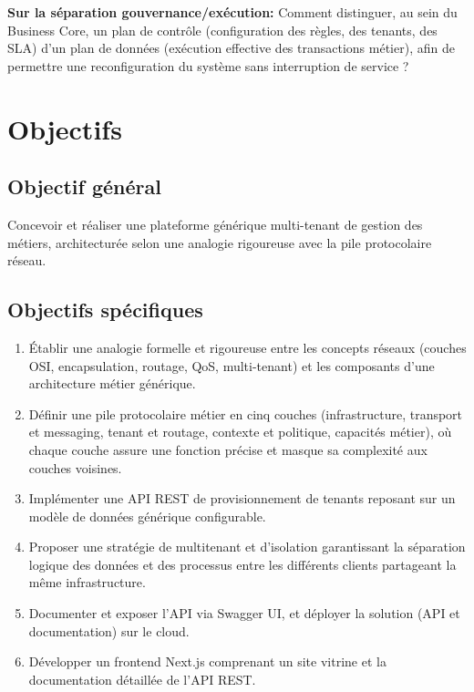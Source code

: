     \textbf{Sur la séparation gouvernance/exécution:} Comment distinguer, au sein du Business Core, un plan de contrôle (configuration des règles, des tenants, des SLA) d'un plan de données (exécution effective des transactions métier), afin de permettre une reconfiguration du système sans interruption de service ?

  
\section{Objectifs}

\subsection{Objectif général}
Concevoir et réaliser une plateforme générique multi-tenant de gestion des métiers,
architecturée selon une analogie rigoureuse avec la pile protocolaire réseau.

\subsection{Objectifs spécifiques}
\begin{enumerate}
  \item Établir une analogie formelle et rigoureuse entre les concepts réseaux (couches
        OSI, encapsulation, routage, QoS, multi-tenant) et les composants d'une
        architecture métier générique.
  \item Définir une pile protocolaire métier en cinq couches (infrastructure, transport et messaging,         tenant et routage, contexte et politique, capacités métier), où chaque couche assure une              fonction précise et masque sa complexité aux couches voisines.%
  \item Implémenter une API REST de provisionnement de tenants reposant sur un modèle de
        données générique configurable.
        
  \item Proposer une stratégie de multitenant et d'isolation garantissant la séparation logique des           données et des processus entre les différents clients partageant la même infrastructure.
  \item Documenter et exposer l'API via Swagger UI, et déployer la solution
        (API et documentation) sur le cloud.
  \item Développer un frontend Next.js comprenant un site vitrine et la documentation détaillée de l'API REST. \end{enumerate}

